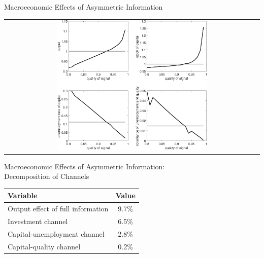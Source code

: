 \documentclass[english,xcolor=svgnames,aspectratio=169]{beamer}
\begin{document}
\begin{frame}{Macroeconomic Effects of Asymmetric Information}
\begin{table}
\scriptsize
\begin{tabular}{c}
\includegraphics[width=0.6\textwidth]{figures/fig_macro}
\end{tabular}
\end{table}
\vspace{-0.5cm}
\end{frame}

\begin{frame}{Macroeconomic Effects of Asymmetric Information:\\ Decomposition of Channels}
\begin{table}
\begin{tabular}{lc}
\hline
\hline
Variable & Value \\
\hline
Output effect of full information & 9.7\% \\
Investment channel  & 6.5\% \\
Capital-unemployment channel & 2.8\% \\
Capital-quality channel &  0.2\% \\
\hline
\hline
\end{tabular}
\end{table}
\end{frame}
\end{document}
